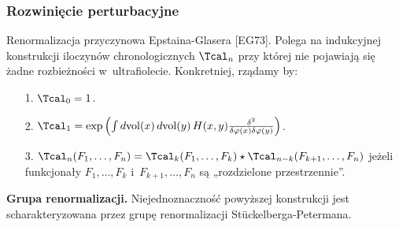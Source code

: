 \documentclass[10pt,t]{beamer}
\begin{document}
\begin{frame}
  \frametitle{Rozwinięcie perturbacyjne}


  Renormalizacja przyczynowa Epstaina-Glasera [EG73].
  Polega na indukcyjnej konstrukcji iloczynów chronologicznych
  $\Tcal_{ n }$ przy której nie pojawiają się żadne
  rozbieżności w~ultrafiolecie. Konkretniej, rządamy by:
  \begin{itemize}
    \RaggedRight

  \item[1.] $\Tcal_{ 0 } = 1$.

  \item[2.]
    $\Tcal_{ 1 } = \exp\left( \int d \mathrm{vol}( x ) \,
      d \mathrm{vol}( y ) \, H( x, y )
      \frac{ \delta^{ 2 } }{ \delta \varphi( x ) \delta \varphi( y ) } \right)$.

  \item[3.]
    $\Tcal_{ n }( F_{ 1 }, \ldots, F_{ n } ) =
    \Tcal_{ k }( F_{ 1 }, \ldots, F_{ k } )
    \star \Tcal_{ n - k }( F_{ k + 1 },\ldots, F_{ n } )$ jeżeli funkcjonały
    $F_{ 1 }, \ldots, F_{ k }$ i~$F_{ k + 1 }, \ldots, F_{ n }$ są
    „rozdzielone przestrzennie”.

  \end{itemize}


  \textbf{Grupa renormalizacji.}
  Niejednoznaczność powyższej konstrukcji jest scharakteryzowana
  przez grupę renormalizacji St\"{u}ckelberga-Petermana.

\end{frame}
\end{document}
